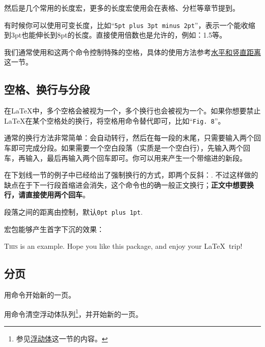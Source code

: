 然后是几个常用的长度宏，更多的长度宏使用会在表格、分栏等章节提到。
\begin{latex}
\textwidth %
\linewidth %
\end{latex}

有时候你可以使用可变长度，比如“\texttt{5pt plus 3pt minus 2pt}”，表示一个能收缩到3pt也能伸长到8pt的长度。直接使用倍数也是允许的，例如：1.5等。

我们通常使用和这两个命令控制特殊的空格，具体的使用方法参考\hyperref[sec:hvspace]{水平和竖直距离}这一节。

\subsection{空格、换行与分段}
在\LaTeX 中，多个空格会被视为一个，多个换行也会被视为一个。如果你想要禁止\LaTeX 在某个空格处的换行，将空格用\texttt{}命令替代即可，比如“\texttt{Fig. 8}”。

通常的换行方法非常简单：会自动转行，然后在每一段的末尾，只需要输入两个回车即可完成分段。如果需要一个空白段落（实质是一个空白行），先输入两个回车，再输入，最后再输入两个回车即可。你可以用来产生一个带缩进的新段。

在下划线一节的例子中已经给出了强制换行的方式，即两个反斜：. 不过这样做的缺点在于下一行段首缩进会消失，这个命令也的确一般正文换行；\textbf{正文中想要换行，请直接使用两个回车}。

段落之间的距离由控制，默认\texttt{0pt plus 1pt}. 
\begin{latex}
\setlength{\parskip}{0pt}
\end{latex}

宏包能够产生首字下沉的效果：
\begin{codeshow}
\lettrine{T}{his} is an example. Hope you like this package, and enjoy your \LaTeX\ trip!
\end{codeshow}

\subsection{分页}
用命令开始新的一页。

用命令清空浮动体队列\footnote{参见\hyperref[sec:float]{浮动体}这一节的内容。}，并开始新的一页。

